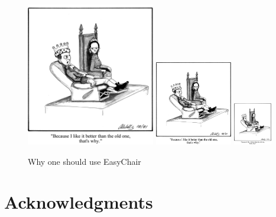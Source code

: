 \documentclass{easychair}
\begin{document}
\begin{figure}[tb]
  \begin{centering}
    \includegraphics[width=0.5\textwidth]{throneEC.jpg}
    \includegraphics[width=0.3\textwidth]{throneEC.jpg}
    \includegraphics[width=0.15\textwidth]{throneEC.jpg}
  \end{centering}
  \caption{Why one should use EasyChair}
  \label{fig:easythrone}
\end{figure}

\section{Acknowledgments}
\label{sect:acks}
\end{document}
